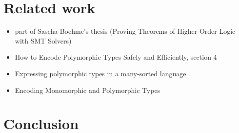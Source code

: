 \documentclass[]{ceurart}
\begin{document}
\section{Related work}

\begin{itemize}
    \item part of Sascha Boehme's thesis (Proving Theorems of Higher-Order Logic with SMT Solvers)
    \item How to Encode Polymorphic Types Safely and Efﬁciently, section 4

    \item Expressing polymorphic types in a many-sorted language
    \item Encoding Monomorphic and Polymorphic Types
\end{itemize}

\section{Conclusion}


\end{document}
